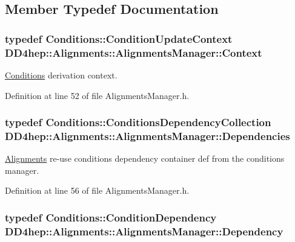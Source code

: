 \subsection{Member Typedef Documentation}
\hypertarget{class_d_d4hep_1_1_alignments_1_1_alignments_manager_a6756d14a9af79dbc28296c765f6bf581}{
\subsubsection[{Context}]{\setlength{\rightskip}{0pt plus 5cm}typedef {\bf Conditions::ConditionUpdateContext} {\bf DD4hep::Alignments::AlignmentsManager::Context}}}
\label{class_d_d4hep_1_1_alignments_1_1_alignments_manager_a6756d14a9af79dbc28296c765f6bf581}


\hyperlink{namespace_d_d4hep_1_1_conditions}{Conditions} derivation context. 

Definition at line 52 of file AlignmentsManager.h.\hypertarget{class_d_d4hep_1_1_alignments_1_1_alignments_manager_ae8068cb8b252db1243c87eccad69e980}{
\subsubsection[{Dependencies}]{\setlength{\rightskip}{0pt plus 5cm}typedef {\bf Conditions::ConditionsDependencyCollection} {\bf DD4hep::Alignments::AlignmentsManager::Dependencies}}}
\label{class_d_d4hep_1_1_alignments_1_1_alignments_manager_ae8068cb8b252db1243c87eccad69e980}


\hyperlink{namespace_d_d4hep_1_1_alignments}{Alignments} re-\/use conditions dependency container def from the conditions manager. 

Definition at line 56 of file AlignmentsManager.h.\hypertarget{class_d_d4hep_1_1_alignments_1_1_alignments_manager_a62dad65e1472f8939e5a83f859e96d26}{
\subsubsection[{Dependency}]{\setlength{\rightskip}{0pt plus 5cm}typedef {\bf Conditions::ConditionDependency} {\bf DD4hep::Alignments::AlignmentsManager::Dependency}}}
\label{class_d_d4hep_1_1_alignments_1_1_alignments_manager_a62dad65e1472f8939e5a83f859e96d26}


